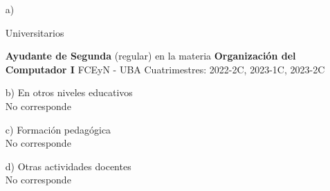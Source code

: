 \begin{enumerate}[leftmargin=0.8cm]
    \item[a)]{Universitarios
        \begin{itemize}[leftmargin=0.2cm]
            \WorkEntry
                {\textbf{Ayudante de Segunda} (regular) en la materia \textbf{Organización del Computador I}}
                {FCEyN - UBA}
                {Cuatrimestres: 2022-2C, 2023-1C, 2023-2C}{}
        \end{itemize}
    }

    \item[b)]{En otros niveles educativos
        \\No corresponde
    }

    \item[c)]{Formación pedagógica
        \\No corresponde
    }

    \item[d)]{Otras actividades docentes
        \\No corresponde
    }
\end{enumerate}
